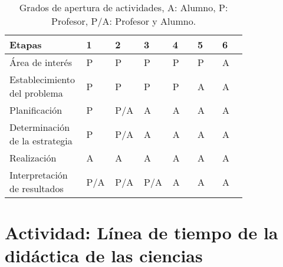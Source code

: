 \documentclass[12pt]{report}
\theoremstyle{largebreak}
\begin{document}
    \begin{table}[ht]
        \begin{center}
            \begin{tabular}{ p{0.2\linewidth} | p{0.1\linewidth} | p{0.1\linewidth} | p{0.1\linewidth} | p{0.1\linewidth} | p{0.1\linewidth} | p{0.1\linewidth} }
                \hline
                \hline
                Etapas & 1 & 2 & 3 & 4 & 5 & 6 \\
                \hline
                Área de interés & P & P & P & P & P & A \\
                Establecimiento del problema & P & P & P & P & A & A \\
                Planificación & P & P/A & A & A & A & A \\
                Determinación de la estrategia & P & P/A & A & A & A & A \\
                Realización & A & A & A & A & A & A \\
                Interpretación de resultados & P/A & P/A & P/A & A & A & A \\
                \hline
                \hline

            \end{tabular}
            \caption{Grados de apertura de actividades, A: Alumno, P: Profesor, P/A: Profesor y Alumno.}
        \end{center}
    \end{table}

    \section{Actividad: Línea de tiempo de la didáctica de las ciencias}
\end{document}
